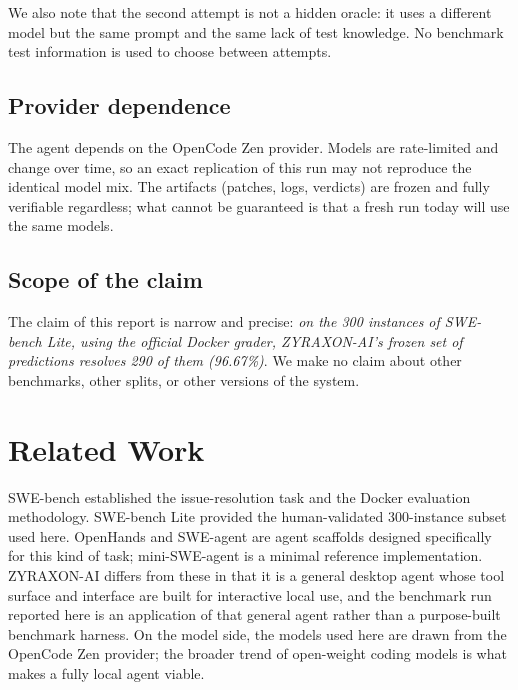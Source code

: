 \documentclass[11pt,a4paper]{article}
\begin{document}
We also note that the second attempt is not a hidden oracle: it uses a different model
but the same prompt and the same lack of test knowledge. No benchmark test information is
used to choose between attempts.

\subsection{Provider dependence}

The agent depends on the OpenCode Zen provider. Models are rate-limited and change
over time, so an exact replication of this run may not reproduce the identical model mix.
The artifacts (patches, logs, verdicts) are frozen and fully verifiable regardless; what
cannot be guaranteed is that a fresh run today will use the same models.

\subsection{Scope of the claim}

The claim of this report is narrow and precise: \emph{on the 300 instances of SWE-bench
Lite, using the official Docker grader, ZYRAXON-AI's frozen set of predictions
resolves 290 of them (96.67\%)}. We make no claim about other benchmarks, other splits, or
other versions of the system.

\section{Related Work}

SWE-bench \cite{jimenez2024swebench} established the issue-resolution task and the Docker
evaluation methodology. SWE-bench Lite \cite{openai2024verified} provided the
human-validated 300-instance subset used here. OpenHands \cite{wang2024openhands} and
SWE-agent \cite{yang2024sweagent} are agent scaffolds designed specifically for this kind
of task; mini-SWE-agent is a minimal reference implementation. ZYRAXON-AI differs from
these in that it is a general desktop agent whose tool surface and interface are built
for interactive local use, and the benchmark run reported here is an application of that
general agent rather than a purpose-built benchmark harness. On the model side, the
models used here are drawn from the OpenCode Zen provider; the broader trend of
open-weight coding models is what makes a fully local agent viable.
\end{document}
